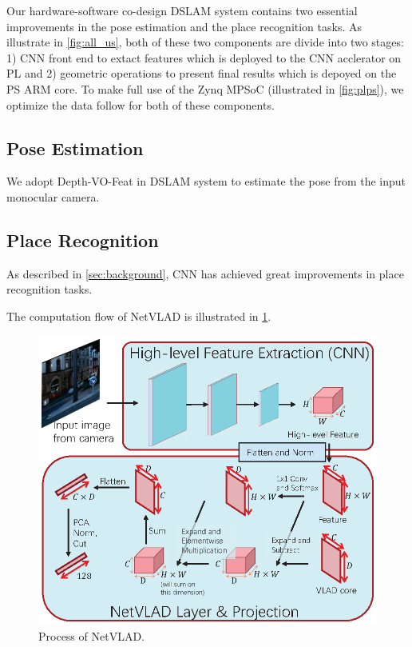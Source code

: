 \label{sec:hardsoft}
Our hardware-software co-design DSLAM system contains two essential improvements in the pose estimation and the place recognition tasks. As illustrate in \cref{fig:all_us}, both of these two components are divide into two stages: 1) CNN front end to extact features which is deployed to the CNN acclerator on PL and 2) geometric operations to present final results which is depoyed on the PS ARM core. To make full use of the Zynq MPSoC (illustrated in \cref{fig:plps}), we optimize the data follow for both of these components.

\subsection{Pose Estimation}
We adopt Depth-VO-Feat \cite{Zhan:2018e92} in DSLAM system to estimate the pose from the input monocular camera.

\subsection{Place Recognition}
As described in \cref{sec:background}, CNN has achieved great improvements in place recognition tasks.

The computation flow of NetVLAD is illustrated in \cref{fig:NetVLAD}.

\begin{figure}[t]
    \centering  
    \includegraphics[width=0.85\linewidth]{fig/NetVLAD.eps}
    \caption{Process of NetVLAD.}
    \label{fig:NetVLAD}
\end{figure}
